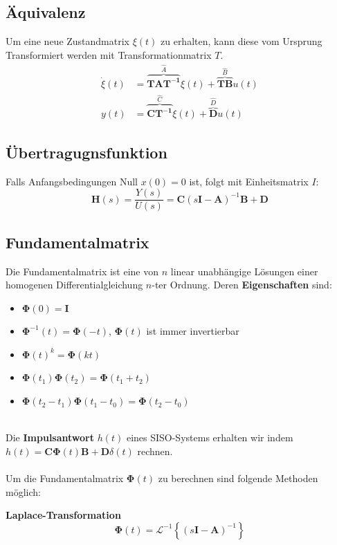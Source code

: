 \subsection{Äquivalenz}
 Um eine neue Zustandmatrix $\xi(t)$ zu erhalten, kann diese vom Ursprung Transformiert werden mit Transformationmatrix $T$. 
\begin{align*}
	\dot{\xi}(t) &= \overbrace{\mathbf{TAT^{-1}}}^{\hat{A}} \xi(t) + \overbrace{\mathbf{TB}}^{\hat{B}} u(t)\\
	y(t) &= \overbrace{\mathbf{CT^{-1}}}^{\hat{C}}\xi(t) + \overbrace{\mathbf{D}}^{\hat{D}}u(t)
\end{align*}


\subsection{Übertragugnsfunktion}
Falls Anfangsbedingungen Null $x(0) = 0$ ist, folgt mit Einheitsmatrix $I$:
\[
\mathbf{H}(s) = \frac{Y(s)}{U(s)} = \mathbf{C}(s\mathbf{I} - \mathbf{A})^{-1}\mathbf{B} + \mathbf{D}
\]

\subsection{Fundamentalmatrix}
Die Fundamentalmatrix ist eine von $n$ linear unabhängige Lösungen einer homogenen Differentialgleichung $n$-ter Ordnung. Deren \textbf{Eigenschaften} sind:
\begin{itemize}[nosep]
	\item $\mathbf{\Phi}(0)  = \mathbf{I}$
	\item $\mathbf{\Phi}^{-1}(t) = \mathbf{\Phi}(-t)$, $\mathbf{\Phi}(t)$ ist immer invertierbar
	\item $\mathbf{\Phi}(t)^{k} = \mathbf{\Phi}(kt)$
	\item $\mathbf{\Phi}(t_1)\mathbf{\Phi}(t_2) = \mathbf{\Phi}(t_1 + t_2)$
	\item $\mathbf{\Phi}(t_2 - t_1)\mathbf{\Phi}(t_1 - t_0) = \mathbf{\Phi}(t_2 - t_0)$
\end{itemize}
~\\
Die \textbf{Impulsantwort} $h(t)$ eines SISO-Systems erhalten wir indem $h(t) = \mathbf{C}\mathbf{\Phi}(t)\mathbf{B} + \mathbf{D}\delta(t)$ rechnen.
~\\~\\
Um die Fundamentalmatrix $\mathbf{\Phi}(t)$ zu berechnen sind folgende Methoden möglich:


\textbf{Laplace-Transformation}
\[
\mathbf{\Phi}(t) = \mathcal{L}^{-1}\left\{(s\mathbf{I} - \mathbf{A})^{-1}\right\}
\]

